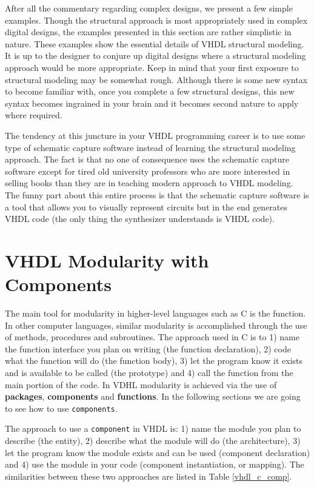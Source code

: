 After all the commentary regarding complex designs, we present a few simple examples. Though the structural approach is most appropriately used in complex digital designs, the examples presented in this section are rather simplistic in nature. These examples show the essential details of VHDL structural modeling. It is up to the designer to conjure up digital designs where a structural modeling approach would be more appropriate. Keep in mind that your first exposure to structural modeling may be somewhat rough. Although there is some new syntax to become familiar with, once you complete a few structural designs, this new syntax becomes ingrained in your brain and it becomes second nature to apply where required.

The tendency at this juncture in your VHDL programming career is to use some type of schematic capture software instead of learning the structural modeling approach. The fact is that no one of consequence uses the schematic capture software except for tired old university professors who are more interested in selling books than they are in teaching modern approach to VHDL modeling. The funny part about this entire process is that the schematic capture software is a tool that allows you to visually represent circuits but in the end generates VHDL code (the only thing the synthesizer understands is VHDL code).

\section{VHDL Modularity with Components}
The main tool for modularity in higher-level languages such as C is the function. In other computer languages, similar modularity is accomplished through the use of methods, procedures and subroutines. The approach used in C is to 1) name the function interface you plan on writing (the function declaration), 2) code what the function will do (the function body), 3) let the program know it exists and is available to be called (the prototype) and 4) call the function from the main portion of the code. In VDHL modularity is achieved via the use of \textbf{packages}, \textbf{components} and \textbf{functions}. In the following sections we are going to see how to use \texttt{components}.

The approach to use a \texttt{component} in VHDL  is: 1) name the module you plan to describe (the entity), 2) describe what the module will do (the architecture), 3) let the program know the module exists and can be used (component declaration) and 4) use the module in your code (component instantiation, or mapping). The similarities between these two approaches are listed in Table \ref{vhdl_c_comp}.


